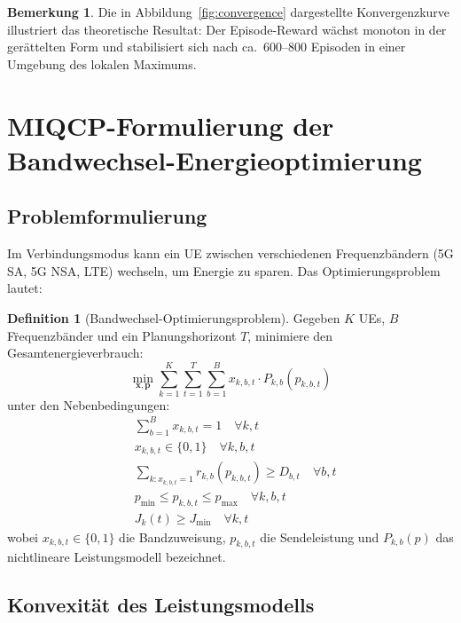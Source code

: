 ﻿\documentclass[a4paper,12pt]{article}
\theoremstyle{definition}
\newtheorem{definition}{Definition}
\newtheorem{bemerkung}{Bemerkung}
\begin{document}
\begin{bemerkung}
  Die in Abbildung~\ref{fig:convergence} dargestellte Konvergenzkurve illustriert das theoretische
  Resultat: Der Episode-Reward w\"achst monoton in der ger\"attelten Form und stabilisiert sich
  nach ca.\ 600--800 Episoden in einer Umgebung des lokalen Maximums.
\end{bemerkung}

\section{MIQCP-Formulierung der Bandwechsel-Energieoptimierung}
\label{sec:miqcp}

\subsection{Problemformulierung}

Im Verbindungsmodus kann ein UE zwischen verschiedenen Frequenzbändern (5G SA, 5G NSA, LTE)
wechseln, um Energie zu sparen. Das Optimierungsproblem lautet:

\begin{definition}[Bandwechsel-Optimierungsproblem]
  Gegeben $K$ UEs, $B$ F\"requenzb\"ander und ein Planungshorizont $T$, minimiere den
  Gesamtenergieverbrauch:
  \[
    \min_{\mathbf{x}, \mathbf{p}} \sum_{k=1}^{K} \sum_{t=1}^{T}
    \sum_{b=1}^{B} x_{k,b,t} \cdot P_{k,b}(p_{k,b,t})
  \]
  unter den Nebenbedingungen:
  \begin{align}
    &\sum_{b=1}^{B} x_{k,b,t} = 1 \quad \forall k, t \label{eq:assign}\\
    &x_{k,b,t} \in \{0,1\} \quad \forall k, b, t \label{eq:binary}\\
    &\sum_{k: x_{k,b,t}=1} r_{k,b}(p_{k,b,t}) \geq D_{b,t} \quad \forall b, t \label{eq:demand}\\
    &p_{\min} \leq p_{k,b,t} \leq p_{\max} \quad \forall k, b, t \label{eq:power_lim}\\
    &J_k(t) \geq J_{\min} \quad \forall k, t \label{eq:fairness}
  \end{align}
  wobei $x_{k,b,t} \in \{0,1\}$ die Bandzuweisung, $p_{k,b,t}$ die Sendeleistung und
  $P_{k,b}(p)$ das nichtlineare Leistungsmodell bezeichnet.
\end{definition}

\subsection{Konvexit\"at des Leistungsmodells}
\end{document}
